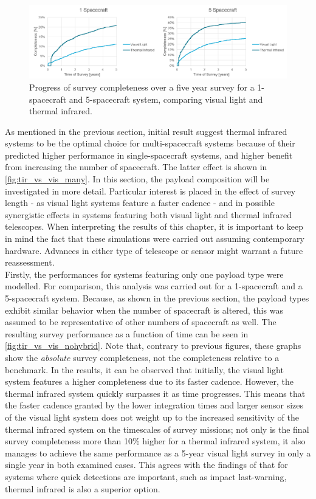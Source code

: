 \begin{figure}[htbp]
 \centering
 \includegraphics[width=1.0\textwidth]{img/tir_vs_vis_1_5.png}
 \caption{Progress of survey completeness over a five year survey for a 1-spacecraft and 5-spacecraft system, comparing visual light and thermal infrared.}
 \label{fig:tir_vs_vis_nohybrid}
\end{figure}


As mentioned in the previous section, initial result suggest thermal infrared systems to be the optimal choice for multi-spacecraft systems because of their predicted higher performance in single-spacecraft systems, and higher benefit from increasing the number of spacecraft. The latter effect is shown in \autoref{fig:tir_vs_vis_many}. In this section, the payload composition will be investigated in more detail. Particular interest is placed in the effect of survey length - as visual light systems feature a faster cadence - and in possible synergistic effects in systems featuring both visual light and thermal infrared telescopes. When interpreting the results of this chapter, it is important to keep in mind the fact that these simulations were carried out assuming contemporary hardware. Advances in either type of telescope or sensor might warrant a future reassessment.\\

Firstly, the performances for systems featuring only one payload type were modelled. For comparison, this analysis was carried out for a 1-spacecraft and a 5-spacecraft system. Because, as shown in the previous section, the payload types exhibit similar behavior when the number of spacecraft is altered, this was assumed to be representative of other numbers of spacecraft as well. The resulting survey performance as a function of time can be seen in \autoref{fig:tir_vs_vis_nohybrid}. Note that, contrary to previous figures, these graphs show the \textit{absolute} survey completeness, not the completeness relative to a benchmark. In the results, it can be observed that initially, the visual light system features a higher completeness due to its faster cadence. However, the thermal infrared system quickly surpasses it as time progresses. This means that the faster cadence granted by the lower integration times and larger sensor sizes of the visual light system does not weight up to the increased sensitivity of the thermal infrared system on the timescales of survey missions; not only is the final survey completeness more than 10\% higher for a thermal infrared system, it also manages to achieve the same performance as a 5-year visual light survey in only a single year in both examined cases. This agrees with the findings of \cite{ThesisOlga} that for systems where quick detections are important, such as impact last-warning, thermal infrared is also a superior option. \\

